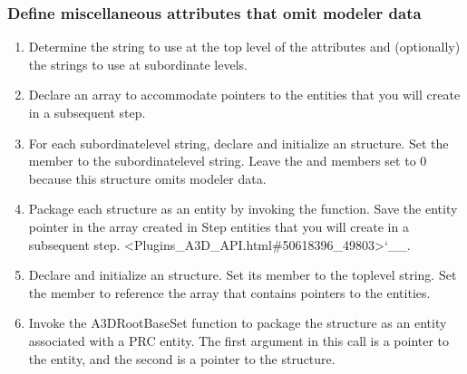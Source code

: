 \documentclass[letterpaper,12pt,english,openany,oneside]{sphinxmanual}
\begin{document}
\subsubsection{Define miscellaneous attributes that omit modeler data}
\label{\detokenize{Plugins_A3D_API:define-miscellaneous-attributes-that-omit-modeler-data}}\begin{enumerate}
%
\item {} 
Determine the string to use at the top level of the attributes and (optionally) the strings to use at subordinate levels.

\item {} 
Declare an array to accommodate pointers to the  entities that you will create in a subsequent step.

\item {} 
For each subordinate\sphinxhyphen{}level string, declare and initialize an  structure. Set the  member to the subordinate\sphinxhyphen{}level string. Leave the  and  members set to 0 because this structure omits modeler data.

\item {} 
Package each  structure as an  entity by invoking the  function. Save the entity pointer in the array created in Step  entities that you will create in a subsequent step. <Plugins\_A3D\_API.html\#50618396\_49803>`\_\_.

\item {} 
Declare and initialize an  structure. Set its  member to the top\sphinxhyphen{}level string. Set the  member to reference the array that contains pointers to the  entities.

\item {} 
Invoke the A3DRootBaseSet function to package the  structure as an  entity associated with a PRC entity. The first argument in this call is a pointer to the entity, and the second is a pointer to the  structure.

\end{enumerate}
\end{document}
